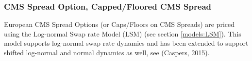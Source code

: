 \subsubsection{CMS Spread Option, Capped/Floored CMS Spread}
\label{pricing:ir_cmsspreadoption}

European CMS Spread Options (or Caps/Floors on CMS Spreads) are priced using 
the Log-normal Swap rate Model 
(LSM) (see section \ref{models:LSM}). This model supports log-normal swap rate 
dynamics and has been extended to support shifted log-normal and normal dynamics 
as well, see (Caspers, 2015).

